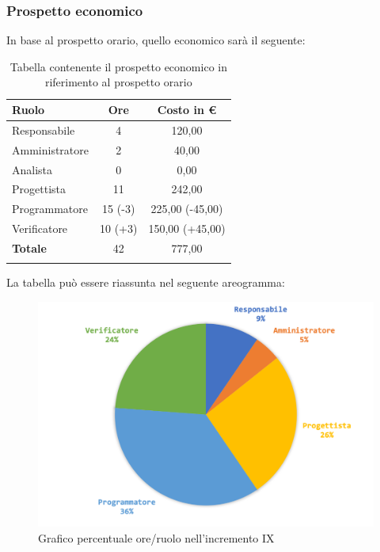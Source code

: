		\subsubsection{Prospetto economico}
			In base al prospetto orario, quello economico sarà il seguente: 
		
		\begin{longtable}{|l|c|c|}
			\hline
			\rowcolor{lighter-grayer}
			\textbf{Ruolo} & \textbf{Ore} & \textbf{Costo in € } \\
			\hline
			\endfirsthead
			
			\hline
			Responsabile 	    & 4 & 120,00\\
			\hline 
			\hline
			Amministratore	   & 2 & 40,00\\
			\hline
			\hline
			Analista 				& 0 & 0,00\\
			\hline
			\hline
			Progettista 		   & 11 & 242,00\\
			\hline
			\hline
			Programmatore 	  & 15 (-3) & 225,00 (-45,00)\\
			\hline
			\hline
			Verificatore 		   & 10 (+3) & 150,00 (+45,00)\\
			\hline
			\textbf{Totale} 	 & 42 & 777,00\\
			\hline
			\caption{Tabella contenente il prospetto economico in riferimento al prospetto orario}
		\end{longtable}
		
		La tabella può essere riassunta nel seguente areogramma:
		\begin{figure}[H]
			\centering
			\includegraphics[width=0.8\linewidth]{images/consuntivo/ConsIncr9-2.png}
			\caption{Grafico percentuale ore/ruolo nell'incremento IX}
			\label{fig:consuntivo grafico costi ruolo incremento IX}
		\end{figure}
		\pagebreak
		
